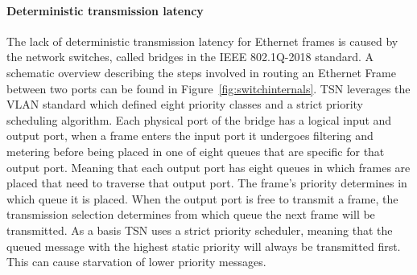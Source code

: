\paragraph{Deterministic transmission latency} The lack of deterministic transmission latency for Ethernet frames is caused by the network switches, called bridges in the IEEE 802.1Q-2018 standard. A schematic overview describing the steps involved in routing an Ethernet Frame between two ports can be found in Figure~\ref{fig:switchinternals}. TSN leverages the VLAN standard which defined eight priority classes and a strict priority scheduling algorithm. Each physical port of the bridge has a logical input and output port, when a frame enters the input port it undergoes filtering and metering before being placed in one of eight queues that are specific for that output port. Meaning that each output port has eight queues in which frames are placed that need to traverse that output port. The frame's priority determines in which queue it is placed. When the output port is free to transmit a frame, the transmission selection determines from which queue the next frame will be transmitted. As a basis TSN uses a strict priority scheduler, meaning that the queued message with the highest static priority will always be transmitted first. This can cause starvation of lower priority messages.

